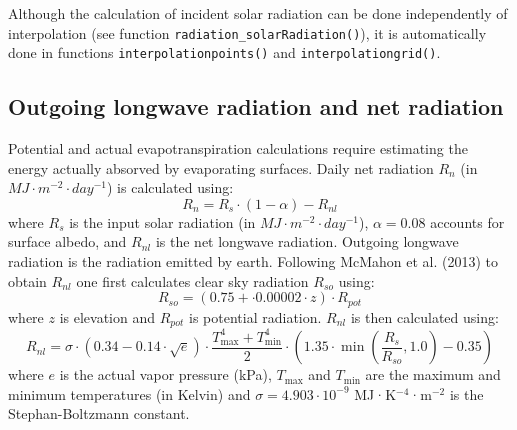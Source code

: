 \documentclass[11pt,a4paper]{article}
\begin{document}
Although the calculation of incident solar radiation can be done independently of interpolation (see function \texttt{radiation\_solarRadiation()}), it is automatically done in functions \texttt{interpolationpoints()} and \texttt{interpolationgrid()}. 

\subsection{Outgoing longwave radiation and net radiation}
Potential and actual evapotranspiration calculations require estimating the energy actually absorved by evaporating surfaces. Daily net radiation $R_n$ (in $MJ\cdot m^{-2}\cdot day^{-1}$) is calculated using:
\begin{equation}
R_n = R_s\cdot (1 - \alpha) - R_{nl}
\end{equation}
where $R_s$ is the input solar radiation (in $MJ\cdot m^{-2}\cdot day^{-1}$), $\alpha = 0.08$ accounts for surface albedo, and $R_{nl}$ is the net longwave radiation. Outgoing longwave radiation is the radiation emitted by earth. Following McMahon et al. (2013) to obtain $R_{nl}$ one first calculates clear sky radiation $R_{so}$ using:
\begin{equation}
  R_{so} = (0.75 + \cdot 0.00002 \cdot z) \cdot R_{pot}
\end{equation}
where $z$ is elevation and $R_{pot}$ is potential radiation. $R_{nl}$ is then calculated using:
\begin{equation}
R_{nl} = \sigma \cdot (0.34 - 0.14 \cdot \sqrt{e}) \cdot \frac{T_{\max}^4 + T_{\min}^4}{2} \cdot (1.35 \cdot \min(\frac{R_s}{R_{so}},1.0) - 0.35)
\end{equation}
where $e$ is the actual vapor pressure (kPa), $T_{\max}$ and $T_{\min}$ are the maximum and minimum temperatures (in Kelvin) and $\sigma = 4.903\cdot 10^{-9}$ MJ·K$^{-4}$·m$^{-2}$ is the Stephan-Boltzmann constant.
\end{document}
